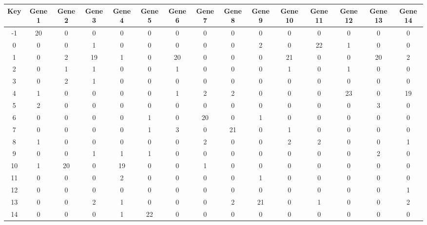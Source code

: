 \begin{tabular}{|c|c|c|c|c|c|c|c|c|c|c|c|c|c|c|}
\hline
Key & Gene 1 & Gene 2 & Gene 3 & Gene 4 & Gene 5 & Gene 6 & Gene 7 & Gene 8 & Gene 9 & Gene 10 & Gene 11 & Gene 12 & Gene 13 & Gene 14 \\
\hline
-1 & 20 & 0 & 0 & 0 & 0 & 0 & 0 & 0 & 0 & 0 & 0 & 0 & 0 & 0 \\
0 & 0 & 0 & 1 & 0 & 0 & 0 & 0 & 0 & 2 & 0 & 22 & 1 & 0 & 0 \\
1 & 0 & 2 & 19 & 1 & 0 & 20 & 0 & 0 & 0 & 21 & 0 & 0 & 20 & 2 \\
2 & 0 & 1 & 1 & 0 & 0 & 1 & 0 & 0 & 0 & 1 & 0 & 1 & 0 & 0 \\
3 & 0 & 2 & 1 & 0 & 0 & 0 & 0 & 0 & 0 & 0 & 0 & 0 & 0 & 0 \\
4 & 1 & 0 & 0 & 0 & 0 & 1 & 2 & 2 & 0 & 0 & 0 & 23 & 0 & 19 \\
5 & 2 & 0 & 0 & 0 & 0 & 0 & 0 & 0 & 0 & 0 & 0 & 0 & 3 & 0 \\
6 & 0 & 0 & 0 & 0 & 1 & 0 & 20 & 0 & 1 & 0 & 0 & 0 & 0 & 0 \\
7 & 0 & 0 & 0 & 0 & 1 & 3 & 0 & 21 & 0 & 1 & 0 & 0 & 0 & 0 \\
8 & 1 & 0 & 0 & 0 & 0 & 0 & 2 & 0 & 0 & 2 & 2 & 0 & 0 & 1 \\
9 & 0 & 0 & 1 & 1 & 1 & 0 & 0 & 0 & 0 & 0 & 0 & 0 & 2 & 0 \\
10 & 1 & 20 & 0 & 19 & 0 & 0 & 1 & 0 & 0 & 0 & 0 & 0 & 0 & 0 \\
11 & 0 & 0 & 0 & 2 & 0 & 0 & 0 & 0 & 1 & 0 & 0 & 0 & 0 & 0 \\
12 & 0 & 0 & 0 & 0 & 0 & 0 & 0 & 0 & 0 & 0 & 0 & 0 & 0 & 1 \\
13 & 0 & 0 & 2 & 1 & 0 & 0 & 0 & 2 & 21 & 0 & 1 & 0 & 0 & 2 \\
14 & 0 & 0 & 0 & 1 & 22 & 0 & 0 & 0 & 0 & 0 & 0 & 0 & 0 & 0 \\
\hline
\end{tabular}